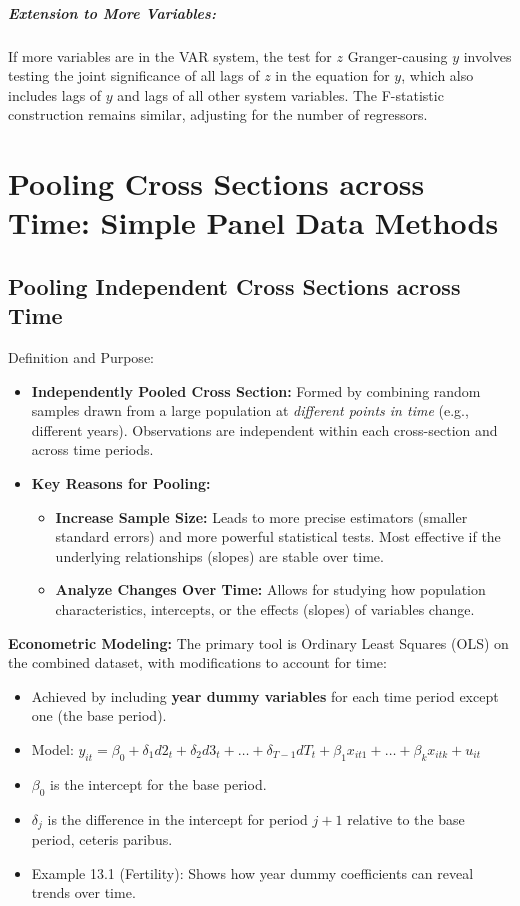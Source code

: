 \documentclass[a4paper, 10pt]{article}
\theoremstyle{definition}	%
\begin{document}
\subparagraph{Extension to More Variables:}
If more variables are in the VAR system, the test for \(z\) Granger-causing \(y\) involves testing the joint significance of all lags of \(z\) in the equation for \(y\), which also includes lags of \(y\) and lags of all other system variables. The F-statistic construction remains similar, adjusting for the number of regressors.

\newpage


\section{Pooling Cross Sections across Time: Simple Panel Data Methods}
\setcounter{equation}{0}
\setcounter{theorem}{0}
\setcounter{assumption}{0}

\subsection{Pooling Independent Cross Sections across Time}
Definition and Purpose:
\begin{itemize}
    \item \textbf{Independently Pooled Cross Section:} Formed by combining random samples drawn from a large population at \textit{different points in time} (e.g., different years). Observations are independent within each cross-section and across time periods.
    \item \textbf{Key Reasons for Pooling:}
    \begin{itemize}
        \item \textbf{Increase Sample Size:} Leads to more precise estimators (smaller standard errors) and more powerful statistical tests. Most effective if the underlying relationships (slopes) are stable over time.
        \item \textbf{Analyze Changes Over Time:} Allows for studying how population characteristics, intercepts, or the effects (slopes) of variables change.
    \end{itemize}
\end{itemize}

\textbf{Econometric Modeling:}
The primary tool is Ordinary Least Squares (OLS) on the combined dataset, with modifications to account for time:
\begin{itemize}
    \item Achieved by including \textbf{year dummy variables} for each time period except one (the base period).
    \item Model: \( y_{it} = \beta_0 + \delta_1 d2_t + \delta_2 d3_t + \dots + \delta_{T-1} dT_t + \beta_1 x_{it1} + \dots + \beta_k x_{itk} + u_{it} \)
    \item \(\beta_0\) is the intercept for the base period.
    \item \(\delta_j\) is the difference in the intercept for period \(j+1\) relative to the base period, ceteris paribus.
    \item Example 13.1 (Fertility): Shows how year dummy coefficients can reveal trends over time.
\end{itemize}
\end{document}
